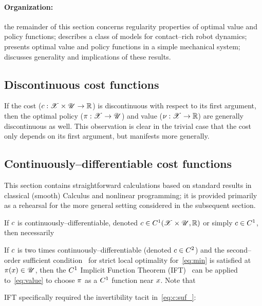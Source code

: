 \documentclass{article}
\begin{document}
\paragraph{Organization:}
the remainder of this section concerns regularity properties of optimal value and policy functions;
 describes a class of models for contact--rich robot dynamics;
 presents optimal value and policy functions in a simple mechanical system;
 discusses generality and implications of these results.


\subsection{Discontinuous cost functions}
\label{sec:value:nc}
If the cost 
($c:\mathscr{X}\times\mathscr{U}\rightarrow\mathbb{R}$) is discontinuous with respect to its first argument, then the optimal policy 
($\pi:\mathscr{X}\rightarrow\mathscr{U}$) and value 
($\nu:\mathscr{X}\rightarrow\mathbb{R}$) are generally discontinuous as well.
This observation is clear in the trivial case that the cost only depends on its first argument, but manifests more generally.


\subsection{Continuously--differentiable cost functions}
\label{sec:value:c}

This section contains straightforward calculations based on standard results in classical (smooth) Calculus and nonlinear programming; it is provided primarily as a rehearsal for the more general setting considered in the subsequent section.

If $c$ is continuously--differentiable, denoted $c\in C^1(\mathscr{X}\times \mathscr{U},\mathbb{R})$ or simply $c\in C^1$, then necessarily~\cite[Ch.~1.1.1]{Polak1997-xd}

If $c$ is two times continuously--differentiable (denoted $c\in C^2$) and the second--order sufficient condition~\cite[Ch.~1.1.2]{Polak1997-xd} for strict local optimality for~\eqref{eq:min} is satisfied at $\pi(x)\in\mathscr{U}$,
then the $C^1$ Implicit Function Theorem (IFT)~\citep[Thm.~C.40]{Lee2012-mb} can be applied to~\eqref{eq:value} to choose $\pi$ as a $C^1$ function near $x$.
Note that 

IFT specifically required the invertibility tacit in~\eqref{eq:c:suf_}: 
\end{document}
